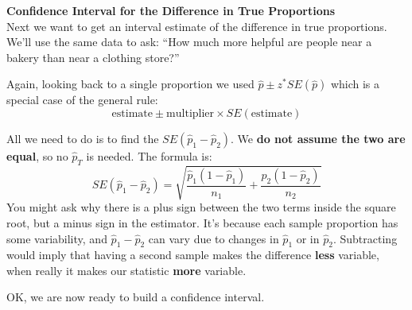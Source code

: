 {\large\bf Confidence Interval for the Difference in True Proportions}
\\
Next we want to get an interval estimate of the difference in true
proportions.  We'll use the same data to ask: ``How much more helpful
are people near a bakery than near a clothing store?''

Again, looking back to a single proportion we used $\widehat{p} \pm
z^*SE(\widehat{p})$ which is a special case of the general rule:
$$ \mbox{estimate} \pm \mbox{multiplier} \times SE(\mbox{estimate})$$

All we need to do is to find the $SE(\widehat{p}_1 - \widehat{p}_2)$.
We {\bf do not assume the two are equal}, so no $\widehat{p}_T$ is
needed. The formula is:
  $$ SE(\widehat{p}_1 - \widehat{p}_2) = \sqrt{ 
      \frac{\widehat{p}_1(1 - \widehat{p}_1)}{n_1} + 
      \frac{\widehat{p}_2(1 - \widehat{p}_2)}{n_2}} $$
You might ask why there is a plus sign between the two terms inside
the square root, but a minus sign in the estimator.  It's because each
sample  proportion has some variability, and $\widehat{p}_1 - \widehat{p}_2 $ 
can vary due to changes in $\widehat{p}_1$ or in $\widehat{p}_2$.  Subtracting
would imply that having a second sample  makes the difference {\bf
  less} variable, when really it makes our statistic {\bf more}
variable. 

OK, we are now ready to build a confidence interval.

